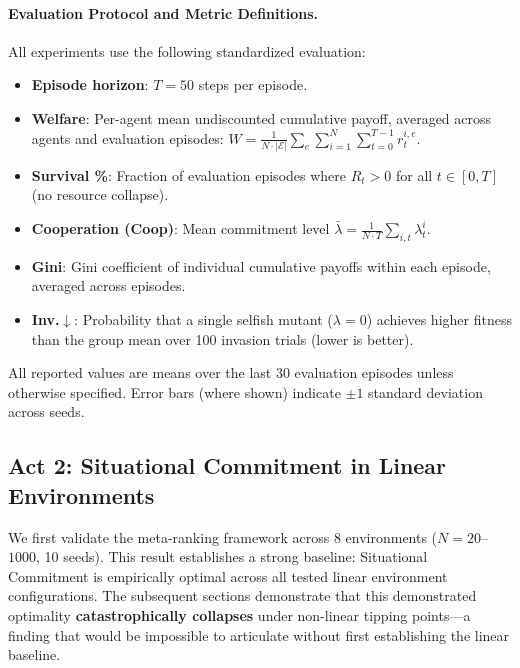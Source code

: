 \documentclass{article}
\begin{document}
\paragraph{Evaluation Protocol and Metric Definitions.}
All experiments use the following standardized evaluation:
\begin{itemize}
    \item \textbf{Episode horizon}: $T = 50$ steps per episode.
    \item \textbf{Welfare}: Per-agent mean undiscounted cumulative payoff, averaged across agents and evaluation episodes: $W = \frac{1}{N \cdot |\mathcal{E}|} \sum_{e} \sum_{i=1}^{N} \sum_{t=0}^{T-1} r_t^{i,e}$.
    \item \textbf{Survival \%}: Fraction of evaluation episodes where $R_t > 0$ for all $t \in [0, T]$ (no resource collapse).
    \item \textbf{Cooperation (Coop)}: Mean commitment level $\bar{\lambda} = \frac{1}{N \cdot T} \sum_{i,t} \lambda_t^i$.
    \item \textbf{Gini}: Gini coefficient of individual cumulative payoffs within each episode, averaged across episodes.
    \item \textbf{Inv.$\downarrow$}: Probability that a single selfish mutant ($\lambda{=}0$) achieves higher fitness than the group mean over 100 invasion trials (lower is better).
\end{itemize}
All reported values are means over the last 30 evaluation episodes unless otherwise specified. Error bars (where shown) indicate $\pm 1$ standard deviation across seeds.

\subsection{Act 2: Situational Commitment in Linear Environments}
\label{sec:linear}

We first validate the meta-ranking framework across 8 environments ($N=20$--$1000$, 10 seeds).
This result establishes a strong baseline: Situational Commitment is empirically optimal across all tested linear environment configurations.
The subsequent sections demonstrate that this demonstrated optimality \textbf{catastrophically collapses} under non-linear tipping points---a finding that would be impossible to articulate without first establishing the linear baseline.
\end{document}
